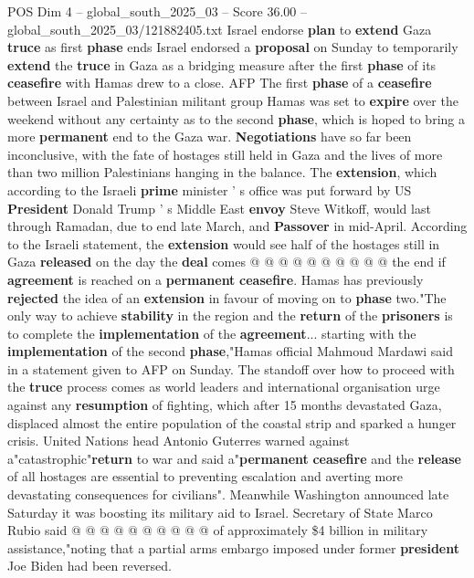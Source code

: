 \begin{textsample}{POS Dim 4 – global\_south\_2025\_03 – Score 36.00 – global\_south\_2025\_03/121882405.txt}  \label{ex:f4_pos_031}
Israel endorse \textbf{plan} to \textbf{extend} Gaza \textbf{truce} as first \textbf{phase} ends Israel endorsed a \textbf{proposal} on Sunday to temporarily \textbf{extend} the \textbf{truce} in Gaza as a bridging measure after the first \textbf{phase} of its \textbf{ceasefire} with Hamas drew to a close.
AFP The first \textbf{phase} of a \textbf{ceasefire} between Israel and Palestinian militant group Hamas was set to \textbf{expire} over the weekend without any certainty as to the second \textbf{phase}, which is hoped to bring a more \textbf{permanent} end to the Gaza war. \textbf{Negotiations} have so far been inconclusive, with the fate of hostages still held in Gaza and the lives of more than two million Palestinians hanging in the balance.
The \textbf{extension}, which according to the Israeli \textbf{prime} minister ' s office was put forward by US \textbf{President} Donald Trump ' s Middle East \textbf{envoy} Steve Witkoff, would last through Ramadan, due to end late March, and \textbf{Passover} in mid-April.
According to the Israeli statement, the \textbf{extension} would see half of the hostages still in Gaza \textbf{released} on the day the \textbf{deal} comes @ @ @ @ @ @ @ @ @ @ the end if \textbf{agreement} is reached on a \textbf{permanent} \textbf{ceasefire}.
Hamas has previously \textbf{rejected} the idea of an \textbf{extension} in favour of moving on to \textbf{phase} two."The only way to achieve \textbf{stability} in the region and the \textbf{return} of the \textbf{prisoners} is to complete the \textbf{implementation} of the \textbf{agreement}... starting with the \textbf{implementation} of the second \textbf{phase},"Hamas official Mahmoud Mardawi said in a statement given to AFP on Sunday.
The standoff over how to proceed with the \textbf{truce} process comes as world leaders and international organisation urge against any \textbf{resumption} of fighting, which after 15 months devastated Gaza, displaced almost the entire population of the coastal strip and sparked a hunger crisis.
United Nations head Antonio Guterres warned against a"catastrophic"\textbf{return} to war and said a"\textbf{permanent} \textbf{ceasefire} and the \textbf{release} of all hostages are essential to preventing escalation and averting more devastating consequences for civilians".
Meanwhile Washington announced late Saturday it was boosting its military aid to Israel.
Secretary of State Marco Rubio said @ @ @ @ @ @ @ @ @ @ of approximately \$4 billion in military assistance,"noting that a partial arms embargo imposed under former \textbf{president} Joe Biden had been reversed.

\end{textsample}
